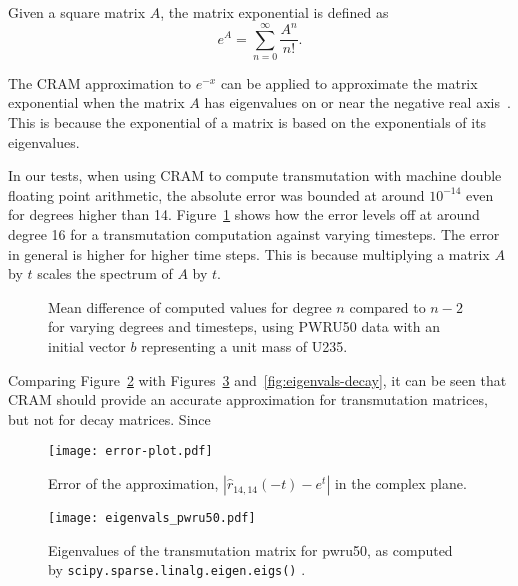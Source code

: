 Given a square matrix $A$, the matrix exponential is defined
as~\cite{ationneeded}
\begin{equation}
  \label{eq:matrix-exponential}
  e^{A} = \sum_{n=0}^\infty \frac{A^n}{n!}.
\end{equation}

The CRAM approximation to $e^{-x}$ can be applied to approximate the matrix
exponential when the matrix $A$ has eigenvalues on or near the negative real
axis~\cite{pusa2010computing}. This is because the exponential of a matrix is
based on the exponentials of its eigenvalues.

In our tests, when using CRAM to compute transmutation with machine double
floating point arithmetic, the absolute error was bounded at around $10^{-14}$
even for degrees higher than 14. Figure~\ref{fig:degrees} shows how the error
levels off at around degree 16 for a transmutation computation against varying
timesteps. The error in general is higher for higher time steps. This is
because multiplying a matrix $A$ by $t$ scales the spectrum of $A$ by $t$.

\begin{figure}[!ht]
\centering
\resizebox{0.9\textwidth}{!}{}
\caption{Mean difference of computed values for degree $n$ compared to $n-2$
  for varying degrees and timesteps, using PWRU50 data with an initial vector
  $b$ representing a unit mass of U235.}
\label{fig:degrees}
\end{figure}

Comparing Figure~\ref{fig:error-plot} with Figures~\ref{fig:eigenvals-pwru50}
and~\ref{fig:eigenvals-decay}, it can be seen that CRAM should provide an
accurate approximation for transmutation matrices, but not for decay matrices.
Since


\begin{figure}[!ht]
\centering
\texttt{[image: error-plot.pdf]}
\caption{Error of the approximation, $\left |\hat{r}_{14,14}(-t) - e^{t}\right
  |$ in the complex plane. }
\label{fig:error-plot}
\end{figure}

\begin{figure}[!ht]
\centering
\texttt{[image: eigenvals\_pwru50.pdf]}
\caption{Eigenvalues of the transmutation matrix for pwru50, as computed by
  \texttt{scipy.\allowbreak{}sparse.\allowbreak{}linalg.\allowbreak{}eigen.\allowbreak{}eigs()}
  .}
\label{fig:eigenvals-pwru50}
\end{figure}


